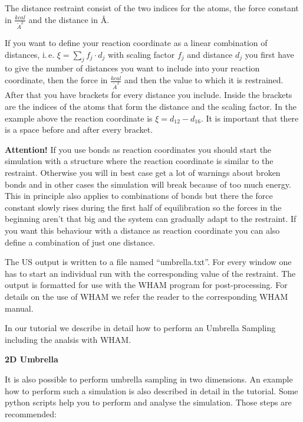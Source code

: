\documentclass[10pt,a4paper]{article} %
\begin{document}
	The distance restraint consist of the two indices for the atoms, the force constant in $\frac{kcal}{{\mathring{A}}^2}$ and the distance in \AA.
	
	If you want to define your reaction coordinate as a linear combination of distances, i.\,e. $\xi = \sum_j f_j \cdot d_j$ with scaling factor $f_j$ and distance $d_j$ you first have to give the number of distances you want to include into your reaction coordinate, then the force in $\frac{kcal}{{\mathring{A}}^2}$ and then the value to which it is restrained. After that you have brackets for every distance you include. Inside the brackets are the indices of the atoms that form the distance and the scaling factor. In the example above the reaction coordinate is $\xi = d_{12} - d_{16}$. It is important that there is a space before and after every bracket.
	
	\textbf{Attention!} If you use bonds as reaction coordinates you should start the simulation with a structure where the reaction coordinate is similar to the restraint. Otherwise you will in best case get a lot of warnings about broken bonds and in other cases the simulation will break because of too much energy. This in principle also applies to combinations of bonds but there the force constant slowly rises during the first half of equilibration so the forces in the beginning aren't that big and the system can gradually adapt to the restraint. If you want this behaviour with a distance as reaction coordinate you can also define a combination of just one distance.
	
	The \acl{US} output is written to a file named ``umbrella.txt''. For every window one has to start an individual run with the corresponding value of the restraint. The output is formatted for use with the \ac{WHAM} program\supercite{wham1, wham2} for post-processing. For details on the use of WHAM we refer the reader to the corresponding \ac{WHAM} manual.
	
	In our tutorial we describe in detail how to perform an Umbrella Sampling including the analsis with WHAM.
	
	\textbf{2D Umbrella}
	
	It is also possible to perform umbrella sampling in two dimensions. An example how to perform such a simulation is also described in detail in the tutorial. Some python scripts help you to perform and analyse the simulation. Those steps are recommended:
	
\end{document}
